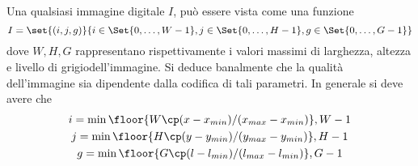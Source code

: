 \documentclass{subfiles}
\begin{document}
Una qualsiasi immagine digitale \(I\), può essere vista come una funzione
\[
    I = \set{(i,j,g)}{i \in \Set{0, \ldots, W - 1}, j \in \Set{0, \ldots, H - 1}, g \in \Set{0, \ldots, G - 1}}
\]
dove \(W, H, G\) rappresentano rispettivamente i valori massimi di larghezza, altezza e livello di grigio\footnotemark[1] dell'immagine.
Si deduce banalmente che la qualità dell'immagine sia dipendente dalla codifica di tali parametri.
In generale si deve avere che
\[\begin{gathered}
        i = \min{\floor{W \cp (x - x_{min}) /(x_{max} - x_{min})}, W - 1} \\
        j = \min{\floor{H \cp (y - y_{min}) /(y_{max} - y_{min})}, H - 1} \\
        g = \min{\floor{G \cp (l - l_{min}) /(l_{max} - l_{min})}, G - 1} \\
    \end{gathered}\]

\end{document}
